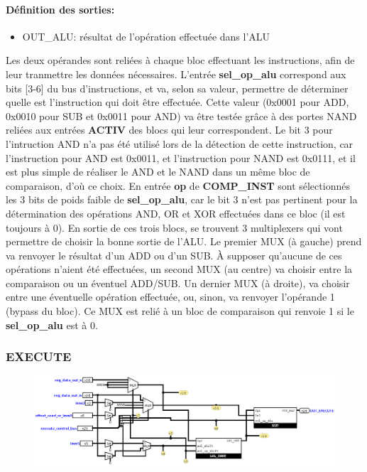 \documentclass[a4paper]{article} %
\begin{document}
\paragraph{Définition des sorties:}
\begin{itemize}
    \item     OUT\_ALU: résultat de l'opération effectuée dans l'ALU
\end{itemize}
\medskip
Les deux opérandes sont reliées à chaque bloc effectuant les instructions, afin de leur tranmettre les données nécessaires. L'entrée \textbf{sel\_op\_alu} correspond aux bits [3-6] du bus d'instructions, et va, selon sa valeur, permettre de déterminer quelle est l'instruction qui doit être effectuée. Cette valeur (0x0001 pour ADD, 0x0010 pour SUB et 0x0011 pour AND) va être testée grâce à des portes NAND reliées aux entrées \textbf{ACTIV} des blocs qui leur correspondent. Le bit 3 pour l'intruction AND n'a pas été utilisé lors de la détection de cette instruction, car l'instruction pour AND est 0x0011, et l'instruction pour NAND est 0x0111, et il est plus simple de réaliser le AND et le NAND dans un même bloc de comparaison, d'où ce choix.
En entrée \textbf{op} de \textbf{COMP\_INST} sont sélectionnés les 3 bits de poids faible de \textbf{sel\_op\_alu}, car le bit 3 n'est pas pertinent pour la détermination des opérations AND, OR et XOR effectuées dans ce bloc (il est toujours à 0).
En sortie de ces trois blocs, se trouvent 3 multiplexers qui vont permettre de choisir la bonne sortie de l'ALU. Le premier MUX (à gauche) prend va renvoyer le résultat d'un ADD ou d'un SUB. À supposer qu'aucune de ces opérations n'aient été effectuées, un second MUX (au centre) va choisir entre la comparaison ou un éventuel ADD/SUB. Un dernier MUX (à droite), va choisir entre une éventuelle opération effectuée, ou, sinon, va renvoyer l'opérande 1 (bypass du bloc). Ce MUX est relié à un bloc de comparaison qui renvoie 1 si le \textbf{sel\_op\_alu} est à 0.
\subsubsection{EXECUTE} \label{execute}
\begin{figure}[H]
    \centering
    \includegraphics[width=1\textwidth]{src/EXECUTE.png}
    \label{fig:execute_pic}
\end{figure}
\end{document}
